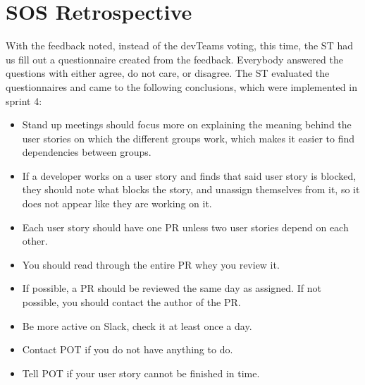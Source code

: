 \section{SOS Retrospective}

With the feedback noted, instead of the \glspl{devTeam} voting, this time, the \gls{ST} had us fill out a questionnaire created from the feedback. Everybody answered the questions with either agree, do not care, or disagree. The \gls{ST} evaluated the questionnaires and came to the following conclusions, which were implemented in sprint 4:

\begin{itemize}
    \item Stand up meetings should focus more on explaining the meaning behind the user stories on which the different groups work, which makes it easier to find dependencies between groups. 
    \item If a developer works on a user story and finds that said user story is blocked, they should note what blocks the story, and unassign themselves from it, so it does not appear like they are working on it.
    \item Each user story should have one \gls{PR} unless two user stories depend on each other. 
    \item You should read through the entire \gls{PR} whey you review it.
    \item If possible, a \gls{PR} should be reviewed the same day as assigned. If not possible, you should contact the author of the \gls{PR}.
    \item Be more active on Slack, check it at least once a day.
    \item Contact \gls{POT} if you do not have anything to do.
    \item Tell \gls{POT} if your user story cannot be finished in time.
\end{itemize}
